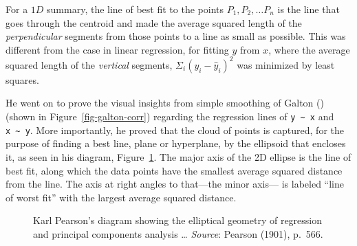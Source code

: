 \documentclass[
  letterpaper,
  10pt,
  krantz2]{krantz}
\begin{document}
For a \(1D\) summary, the line of best fit to the points
\(P_1, P_2, \dots P_n\) is the line that goes through the centroid and
made the average squared length of the \emph{perpendicular} segments
from those points to a line as small as possible. This was different
from the case in linear regression, for fitting \(y\) from \(x\), where
the average squared length of the \emph{vertical} segments,
\(\Sigma_i (y_i - \hat{y}_i)^2\) was minimized by least squares.

He went on to prove the visual insights from simple smoothing of Galton
() (shown in
Figure~\ref{fig-galton-corr}) regarding the regression lines of
\texttt{y\ \textasciitilde{}\ x} and \texttt{x\ \textasciitilde{}\ y}.
More importantly, he proved that the cloud of points is captured, for
the purpose of finding a best line, plane or hyperplane, by the
ellipsoid that encloses it, as seen in his diagram,
Figure~\ref{fig-Pearson1901-2}. The major axis of the 2D ellipse is the
line of best fit, along which the data points have the smallest average
squared distance from the line. The axis at right angles to that---the
minor axis--- is labeled ``line of worst fit'' with the largest average
squared distance.

\begin{figure}


\caption{\label{fig-Pearson1901-2}Karl Pearson's diagram showing the
elliptical geometry of regression and principal components analysis
\ldots{} \emph{Source}: Pearson (1901), p.~566.}

\end{figure}%
\end{document}
